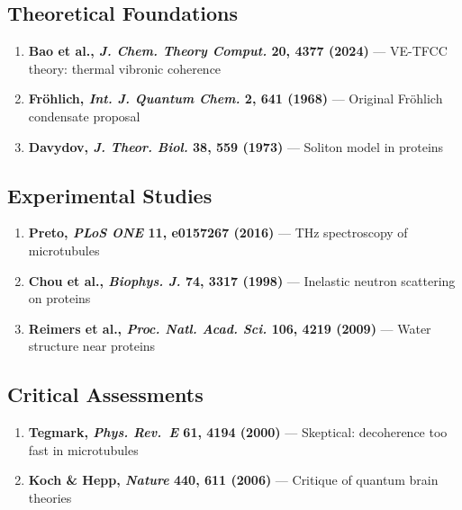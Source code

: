 \subsection{Theoretical Foundations}\label{theoretical-foundations}

\begin{enumerate}
\def\labelenumi{\arabic{enumi}.}
\tightlist
\item
  \textbf{Bao et al., \emph{J. Chem. Theory Comput.} 20, 4377 (2024)}
  --- VE-TFCC theory: thermal vibronic coherence
\item
  \textbf{Fröhlich, \emph{Int. J. Quantum Chem.} 2, 641 (1968)} ---
  Original Fröhlich condensate proposal
\item
  \textbf{Davydov, \emph{J. Theor. Biol.} 38, 559 (1973)} ---
  Soliton model in proteins
\end{enumerate}

\subsection{Experimental Studies}\label{experimental-studies}

\begin{enumerate}
\def\labelenumi{\arabic{enumi}.}
\setcounter{enumi}{3}
\tightlist
\item
  \textbf{Preto, \emph{PLoS ONE} 11, e0157267 (2016)} --- THz
  spectroscopy of microtubules
\item
  \textbf{Chou et al., \emph{Biophys. J.} 74, 3317 (1998)} ---
  Inelastic neutron scattering on proteins
\item
  \textbf{Reimers et al., \emph{Proc. Natl. Acad. Sci.} 106, 4219
  (2009)} --- Water structure near proteins
\end{enumerate}

\subsection{Critical Assessments}\label{critical-assessments}

\begin{enumerate}
\def\labelenumi{\arabic{enumi}.}
\setcounter{enumi}{6}
\tightlist
\item
  \textbf{Tegmark, \emph{Phys. Rev.~E} 61, 4194 (2000)} ---
  Skeptical: decoherence too fast in microtubules
\item
  \textbf{Koch \& Hepp, \emph{Nature} 440, 611 (2006)} --- Critique
  of quantum brain theories
\end{enumerate}

